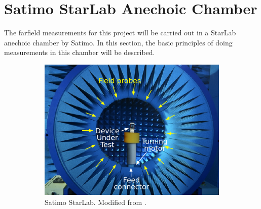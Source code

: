\section{Satimo StarLab Anechoic Chamber}
The farfield measurements for this project will be carried out in a StarLab anechoic chamber by Satimo. In this section, the basic principles of doing measurements in this chamber will be described.

\begin{figure}[htbp]
    \centering
    \begin{subfigure}[t]{0.49\linewidth} 
        \centering
        \includegraphics{img/analysis/satimo}
        \caption{Satimo StarLab. Modified from \cite{satimo}.}
        \label{fig:starlabchamber}
    \end{subfigure}
    \hfill
    \begin{subfigure}[t]{0.49\linewidth}
        \centering

\end{subfigure}
\end{figure}

